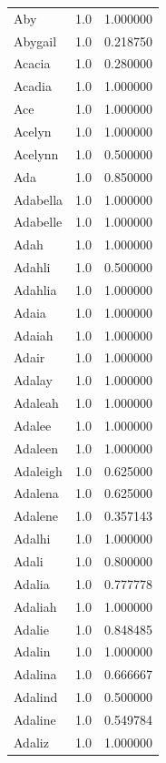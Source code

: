\documentclass[
  letterpaper,
  DIV=11,
  numbers=noendperiod]{scrreprt}
\begin{document}
\begin{tabular}{lrr}
Aby             &   1.0 &   1.000000 \\
Abygail         &   1.0 &   0.218750 \\
Acacia          &   1.0 &   0.280000 \\
Acadia          &   1.0 &   1.000000 \\
Ace             &   1.0 &   1.000000 \\
Acelyn          &   1.0 &   1.000000 \\
Acelynn         &   1.0 &   0.500000 \\
Ada             &   1.0 &   0.850000 \\
Adabella        &   1.0 &   1.000000 \\
Adabelle        &   1.0 &   1.000000 \\
Adah            &   1.0 &   1.000000 \\
Adahli          &   1.0 &   0.500000 \\
Adahlia         &   1.0 &   1.000000 \\
Adaia           &   1.0 &   1.000000 \\
Adaiah          &   1.0 &   1.000000 \\
Adair           &   1.0 &   1.000000 \\
Adalay          &   1.0 &   1.000000 \\
Adaleah         &   1.0 &   1.000000 \\
Adalee          &   1.0 &   1.000000 \\
Adaleen         &   1.0 &   1.000000 \\
Adaleigh        &   1.0 &   0.625000 \\
Adalena         &   1.0 &   0.625000 \\
Adalene         &   1.0 &   0.357143 \\
Adalhi          &   1.0 &   1.000000 \\
Adali           &   1.0 &   0.800000 \\
Adalia          &   1.0 &   0.777778 \\
Adaliah         &   1.0 &   1.000000 \\
Adalie          &   1.0 &   0.848485 \\
Adalin          &   1.0 &   1.000000 \\
Adalina         &   1.0 &   0.666667 \\
Adalind         &   1.0 &   0.500000 \\
Adaline         &   1.0 &   0.549784 \\
Adaliz          &   1.0 &   1.000000 \\

\end{tabular}
\end{document}
